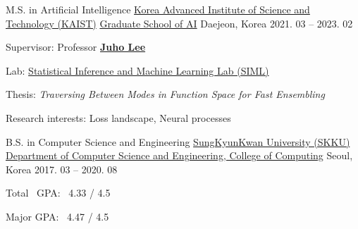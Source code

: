 \documentclass[11pt, a4paper]{cv}
\begin{document}
\begin{cventries}
\vspace{-1mm}

  \cveducation
    {M.S. in Artificial Intelligence} %
    {\href{https://www.kaist.ac.kr/en/}{Korea Advanced Institute of Science and Technology (KAIST)}} %
    {\href{https://gsai.kaist.ac.kr}{Graduate School of AI}} %
    {Daejeon, Korea} %
    {2021. 03 -- 2023. 02} %
    {
      \begin{cvitems} %
        \item {Supervisor: Professor \href{https://juho-lee.github.io}{\bfseries\color{graytext} Juho Lee}}
        \item {Lab: \href{https://siml.kaist.ac.kr}{Statistical Inference and Machine Learning Lab (SIML)}}
        \item {Thesis: \textit{Traversing Between Modes in Function Space for Fast Ensembling}}
        \item {Research interests: Loss landscape, Neural processes}
      \end{cvitems}
    }

  \cveducation
    {B.S. in Computer Science and Engineering} %
    {\href{https://www.skku.edu/eng/}{SungKyunKwan University (SKKU)}} %
    {\href{https://cs.skku.edu/en/college/department/cse_intro}{Department of Computer Science and Engineering, College of Computing}} %
    {Seoul, Korea} %
    {2017. 03 -- 2020. 08} %
    {
      \begin{cvitems} %
        \item {Total \ GPA: \ 4.33 / 4.5}
        \item {Major GPA: \ 4.47 / 4.5}
      \end{cvitems}
    }

\end{cventries}

\restoregeometry
\end{document}
